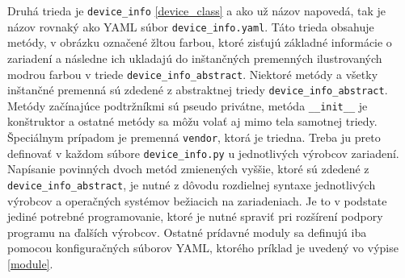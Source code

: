 Druhá trieda je \texttt{device\_info} \ref{device_class} a ako už názov napovedá, tak je názov rovnaký ako YAML súbor \texttt{device\_info.yaml}. Táto trieda obsahuje metódy, v obrázku označené žltou farbou, ktoré zisťujú základné informácie o zariadení a následne ich ukladajú do inštančných premenných ilustrovaných modrou farbou v triede \texttt{device\_info\_abstract}. Niektoré metódy a všetky inštančné premenná sú zdedené z abstraktnej triedy \texttt{device\_info\_abstract}. Metódy začínajúce podtržníkmi sú pseudo privátne, metóda \texttt{\_\_init\_\_} je konštruktor a ostatné metódy sa môžu volať aj mimo tela samotnej triedy. Špeciálnym prípadom je premenná \texttt{vendor}, ktorá je triedna. Treba ju preto definovať v každom súbore \texttt{device\_info.py} u jednotlivých výrobcov zariadení. Napísanie povinných dvoch metód zmienených vyššie, ktoré sú zdedené z \texttt{device\_info\_abstract}, je nutné z dôvodu rozdielnej syntaxe jednotlivých výrobcov a operačných systémov bežiacich na zariadeniach. Je to v podstate jediné potrebné programovanie, ktoré je nutné spraviť pri rozšírení podpory programu na ďalších výrobcov. Ostatné prídavné moduly sa definujú iba pomocou konfiguračných súborov YAML, ktorého príklad je uvedený vo výpise \ref{module}.
 
